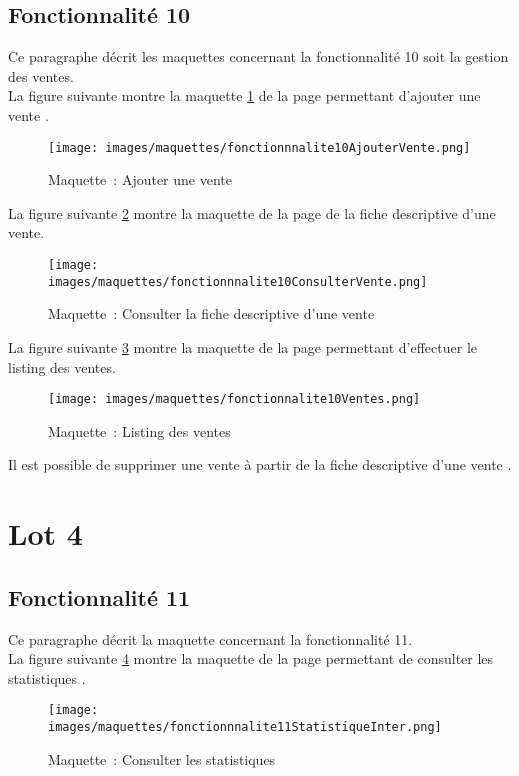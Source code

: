 \subsection{Fonctionnalité 10}
Ce paragraphe décrit les maquettes concernant la fonctionnalité 10 soit la gestion des ventes. \\

La figure suivante montre la maquette \ref{maquette10-5} de la page permettant d'ajouter une vente .
\begin{figure}[H]
	\centering
	\texttt{[image: images/maquettes/fonctionnnalite10AjouterVente.png]}
	\caption{Maquette~: Ajouter une vente}
	\label{maquette10-5}
\end{figure}

La figure suivante \ref{maquette10-3} montre la maquette de la page de la fiche descriptive d'une vente.
\begin{figure}[H]
	\centering
	\texttt{[image: images/maquettes/fonctionnnalite10ConsulterVente.png]}
	\caption{Maquette~: Consulter la fiche descriptive d'une vente}
	\label{maquette10-3}
\end{figure}

La figure suivante \ref{maquette10-4} montre la maquette de la page permettant d'effectuer le listing des ventes.
\begin{figure}[H]
	\centering
	\texttt{[image: images/maquettes/fonctionnalite10Ventes.png]}
	\caption{Maquette~: Listing des ventes}
	\label{maquette10-4}
\end{figure}

Il est possible de supprimer une vente à partir de la fiche descriptive d'une vente .

\section{Lot 4}
\subsection{Fonctionnalité 11}
Ce paragraphe décrit la maquette concernant la fonctionnalité 11.\\

La figure suivante \ref{maquette11} montre la maquette de la page permettant de consulter les statistiques .
\begin{figure}[H]
	\centering
	\texttt{[image: images/maquettes/fonctionnnalite11StatistiqueInter.png]}
	\caption{Maquette~: Consulter les statistiques}
	\label{maquette11}
\end{figure}



